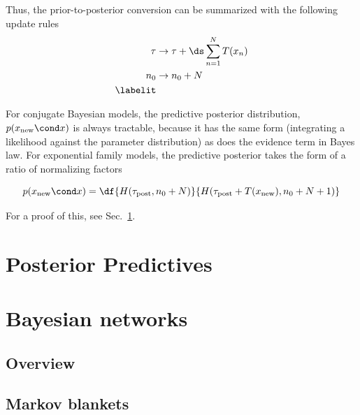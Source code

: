 \documentclass{article} %
\begin{document}
Thus, the prior-to-posterior conversion can be summarized with the following update rules
\begin{align*}
\tau & \to \tau + \ds\sum_{n=1}^N T(x_n) \\
n_0 & \to  n_0 + N \\
\labelit \label{eqn:general_formalism_prior_to_posterior_conversion}
\end{align*}

For conjugate Bayesian models, the predictive posterior distribution, $p(x_{\text{new}} \cond x)$ is always tractable, because it has the same form (integrating a likelihood against the parameter distribution) as does the evidence term in Bayes law.   For exponential family models, the predictive posterior takes the form of a ratio of normalizing factors

\begin{equation}
p(x_{\text{new}} \cond x) = \df{H(\tau_{\text{post}}, n_0 + N)}{H(\tau_{\text{post}} + T(x_{\text{new}}), n_0 + N + 1)}
\label{eqn:predictive_posterior_exptl_family}
\end{equation}

For a proof of this, see Sec.~\ref{sec:posterior_predictives}.


\section{Posterior Predictives} \label{sec:posterior_predictives}



\section{Bayesian networks} \label{sec:bayesian_networks}


\subsection{Overview}




\subsection{Markov blankets} \label{sec:markov_blankets}
\end{document}

